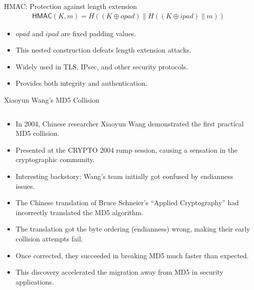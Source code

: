 \documentclass[aspectratio=169, lualatex, handout]{beamer}
\begin{document}
\begin{frame}{HMAC: Protection against length extension}
	\begin{align*}
		\textsf{HMAC}(K, m) = H((K \oplus opad) \| H((K \oplus ipad) \| m))
	\end{align*}
	\begin{itemize}
		\item $opad$ and $ipad$ are fixed padding values.
		\item This nested construction defeats length extension attacks.
		\item Widely used in TLS, IPsec, and other security protocols.
		\item Provides both integrity and authentication.
	\end{itemize}
\end{frame}

\begin{frame}{Xiaoyun Wang's MD5 Collision}
	\begin{columns}[c]
		\begin{column}{1\textwidth}
			\begin{itemize}
				\item In 2004, Chinese researcher Xiaoyun Wang demonstrated the first practical MD5 collision.
				\item Presented at the CRYPTO 2004 rump session, causing a sensation in the cryptographic community.
				\item Interesting backstory: Wang's team initially got confused by endianness issues.
				\item The Chinese translation of Bruce Schneier's ``Applied Cryptography'' had incorrectly translated the MD5 algorithm.
				\item The translation got the byte ordering (endianness) wrong, making their early collision attempts fail.
				\item Once corrected, they succeeded in breaking MD5 much faster than expected.
				\item This discovery accelerated the migration away from MD5 in security applications.
			\end{itemize}
		\end{column}
	\end{columns}
\end{frame}
\end{document}
